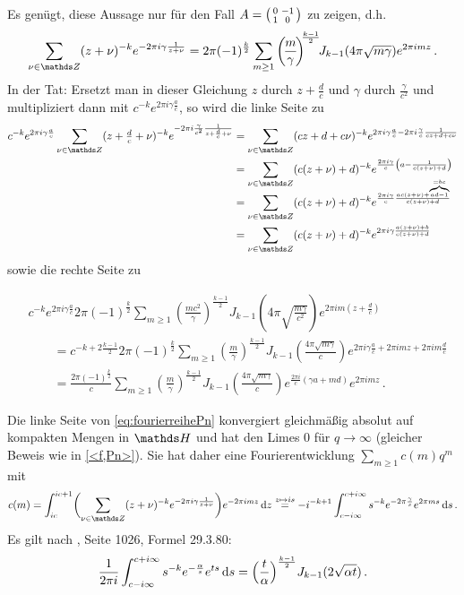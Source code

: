 \begin{bewe}
\begin{bewe}
Es genügt, diese Aussage nur für den Fall $A = \mymat 0{-1}10$ zu zeigen, d.h.
\[
	\sum_{\nu \in \ZZ} (z + \nu)^{-k} e^{-2\pi i\gamma \frac{1}{z+\nu}} = 2\pi (-1)^{\frac k2} \sum_{m \geq 1} \left(\!\frac m\gamma\!\right)^{\!\!\frac{k-1}2} \!\! J_{k-1}(4\pi\sqrt{m\gamma}) e^{2\pi imz}
	\,.
\]
In der Tat: Ersetzt man in dieser Gleichung $z$ durch $z + \frac dc$ und $\gamma$ durch $\frac{\gamma}{c^2}$ und multipliziert dann mit $c^{-k} e^{2\pi i \gamma \frac ac}$, so wird die linke Seite zu
\begin{align*}
	c^{-k} e^{2\pi i\gamma \frac ac} \sum_{\nu \in \ZZ} (z + \tfrac dc + \nu)^{-k} e^{-2\pi i \frac{\gamma}{c^2} \frac{1}{z + \frac dc + \nu}} 
	&= \sum_{\nu \in \ZZ} (cz + d + c\nu)^{-k} e^{2\pi i\gamma \frac ac - 2\pi i \frac{\gamma}{c} \frac{1}{cz + d + c\nu}} \\
	&= \sum_{\nu \in \ZZ} (c(z + \nu) + d)^{-k} e^{\frac{2\pi i\gamma}c \left( a - \frac{1}{c(z + \nu) + d} \right)} \\[-12pt]
	&= \sum_{\nu \in \ZZ} (c(z + \nu) + d)^{-k} e^{\frac{2\pi i\gamma}c \frac{ac(z + \nu) + \overbrace{\scriptscriptstyle ad - 1}^{= bc}}{c(z + \nu) + d}} \\
	&= \sum_{\nu \in \ZZ} (c(z + \nu) + d)^{-k} e^{2\pi i\gamma \frac{a(z + \nu) + b}{c(z + \nu) + d}}
\end{align*}
sowie die rechte Seite zu

\begin{align}\label{eq:fourierreihePn}
&c^{-k} e^{2\pi i \gamma \frac ac} 2\pi (-1)^{\frac k2} \sum_{m\geq 1} \left(\!\frac {mc^2}{\gamma}\right)^{\!\!\frac {k-1}2} \!\! J_{k-1} \left(\! 4\pi \sqrt{\frac{m\gamma}{c^2}}\right) e^{2\pi i m(z + \frac dc)} \\
&\qquad = c^{-k+2\frac{k-1}2} 2\pi (-1)^{\frac k2} \sum_{m\geq 1} \left(\!\frac {m}{\gamma}\!\right)^{\!\!\frac {k-1}2} \!\! J_{k-1} \left(\! \tfrac{4\pi \sqrt{m\gamma}}c\right) e^{2\pi i \gamma \frac ac + 2\pi i mz + 2\pi im\frac dc} \nonumber \\
&\qquad = \frac{2\pi (-1)^{\frac k2}}c \sum_{m\geq 1} \left(\!\frac {m}{\gamma}\!\right)^{\!\!\frac {k-1}2} \!\! J_{k-1} \left(\! \tfrac{4\pi \sqrt{m\gamma}}c\right) e^{\frac{2\pi i}c \left(\gamma a + md\right)} e^{2\pi i mz} \nonumber
\,.
\end{align}

Die linke Seite von \eqref{eq:fourierreihePn} konvergiert gleichmäßig absolut auf kompakten Mengen in $\HH$ und hat den Limes 0 für $q\to \infty$ (gleicher Beweis wie in \autoref{<f,Pn>}).
Sie hat daher eine Fourierentwicklung $\sum_{m\geq 1} c(m) q^m$ mit
\[
c(m) = \int_{ic}^{ic+1} \biggl( \sum_{\nu \in \ZZ} (z+\nu)^{-k} e^{-2\pi i \gamma \frac{1}{z+\nu}} \biggr) e^{-2\pi imz} \opd z
\stackrel{z \mapsto is}{=} -i^{-k+1} \int_{c-i \infty}^{c + i\infty} s^{-k} e^{-2\pi \frac{\gamma}{s}} e^{2\pi ms} \opd s
\,.
\]
Es gilt nach , Seite 1026, Formel 29.3.80:
\[
\frac{1}{2\pi i} \int_{c-i\infty}^{c+i\infty} s^{-k} e^{-\frac{\alpha}{s}} e^{ts} \,\mathrm{d} s = \Bigl(\frac{t}{\alpha}\Bigr)^{\frac{k-1}{2}} J_{k-1}(2\sqrt{\alpha t})
\,.
\]


\end{bewe}
\end{bewe}
